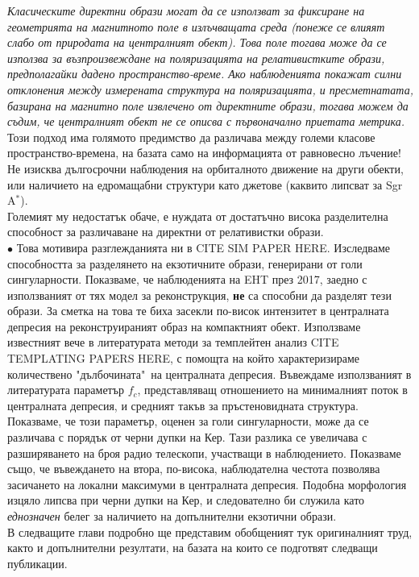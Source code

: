 \emph{Класическите директни образи могат да се използват за фиксиране на геометрията на магнитното поле в излъчващата среда (понеже се влияят слабо от природата на централният обект). Това поле тогава може да се използва за възпроизвеждане на поляризацията на релативистките образи, предполагайки дадено пространство-време. Ако наблюденията покажат силни отклонения между измерената структура на поляризацията, и пресметнатата, базирана на магнитно поле извлечено от директните образи, тогава можем да съдим, че централният обект не се описва с първоначално приетата метрика.}\\\newline
Този подход има голямото предимство да различава между големи класове пространство-времена, на базата само на информацията от равновесно лъчение! Не изисква дългосрочни наблюдения на орбиталното движение на други обекти, или наличието на едромащабни структури като джетове (каквито липсват за Sgr A$^*$).\\

\noindent Големият му недостатък обаче, е нуждата от достатъчно висока разделителна способност за различаване на директни от релативистки образи. \\\newline
$\bullet$ Това мотивира разглежданията ни в CITE SIM PAPER HERE. Изследваме способността за разделянето на екзотичните образи, генерирани от голи сингуларности. Показваме, че наблюденията на EHT през 2017, заедно с използваният от тях модел за реконструкция, \textbf{не} са способни да разделят тези образи. За сметка на това те биха засекли по-висок интензитет в централната депресия на реконструираният образ на компактният обект. Използваме известният вече в литературата методи за темплейтен анализ CITE TEMPLATING PAPERS HERE, с помощта на който характеризираме количествено "дълбочината"$\,$ на централната депресия. Въвеждаме използваният в литературата параметър $f_c$, представляващ отношението на минималният поток в централната депресия, и средният такъв за пръстеновидната структура. Показваме, че този параметър, оценен за голи сингуларности, може да се различава с порядък от черни дупки на Кер. Тази разлика се увеличава с разширяването на броя радио телескопи, участващи в наблюдението. Показваме също, че въвеждането на втора, по-висока, наблюдателна честота позволява засичането на локални максимуми в централната депресия. Подобна морфология изцяло липсва при черни дупки на Кер, и следователно би служила като \emph{еднозначен} белег за наличието на допълнителни екзотични образи.\\\newline
В следващите глави подробно ще представим обобщеният тук оригиналният труд, както и допълнителни резултати, на базата на които се подготвят следващи публикации. 
\lfoot{}